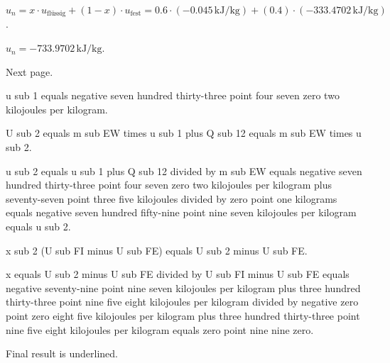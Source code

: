 \( u_{n} = x \cdot u_{\text{flüssig}} + (1 - x) \cdot u_{\text{fest}} = 0.6 \cdot (-0.045 \, \text{kJ/kg}) + (0.4) \cdot (-333.4702 \, \text{kJ/kg}) \).  

\( u_{n} = -733.9702 \, \text{kJ/kg} \).  

Next page.

u sub 1 equals negative seven hundred thirty-three point four seven zero two kilojoules per kilogram.  

U sub 2 equals m sub EW times u sub 1 plus Q sub 12 equals m sub EW times u sub 2.  

u sub 2 equals u sub 1 plus Q sub 12 divided by m sub EW equals negative seven hundred thirty-three point four seven zero two kilojoules per kilogram plus seventy-seven point three five kilojoules divided by zero point one kilograms equals negative seven hundred fifty-nine point nine seven kilojoules per kilogram equals u sub 2.  

x sub 2 (U sub FI minus U sub FE) equals U sub 2 minus U sub FE.  

x equals U sub 2 minus U sub FE divided by U sub FI minus U sub FE equals negative seventy-nine point nine seven kilojoules per kilogram plus three hundred thirty-three point nine five eight kilojoules per kilogram divided by negative zero point zero eight five kilojoules per kilogram plus three hundred thirty-three point nine five eight kilojoules per kilogram equals zero point nine nine zero.  

Final result is underlined.
